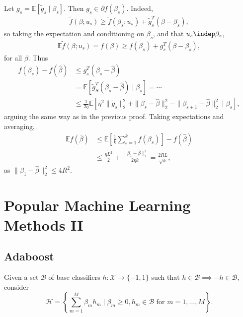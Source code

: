 \documentclass[12pt]{article}
\begin{document}
\begin{proofbox}
	Let $g_s = \mathbb{E}[\tilde g_s \mid \beta_s]$. Then $g_s \in \partial f(\beta_s)$. Indeed,
	\begin{align*}
		\tilde f(\beta; u_s) \geq \tilde f(\beta_s; u_s) + \tilde g_s^T (\beta - \beta_s),
	\end{align*}
	so taking the expectation and conditioning on $\beta_s$, and that $u_s \indep \beta_s$,
	\begin{align*}
		\mathbb{E} \tilde f(\beta; u_s) = f(\beta) \geq f(\beta_s) + g_s^T (\beta - \beta_s),
	\end{align*}
	for all $\beta$. Thus
	\begin{align*}
		f(\beta_s) - f(\hat \beta) &\leq g_s^T(\beta_s - \hat \beta) \\
					   &= \mathbb{E}[ \tilde g_S^T(\beta_s - \hat \beta) \mid \beta_s] = \cdots \\
					   &\leq \frac{1}{2 \eta} \mathbb{E}[\eta^2 \|\tilde g_s\|_2^2 + \|\beta_s - \hat \beta\|_2^2 - \|\beta_{s+1} - \hat \beta\|_2^2 \mid \beta_s],
	\end{align*}
	arguing the same way as in the previous proof. Taking expectations and averaging,
	\begin{align*}
		\mathbb{E} f(\bar \beta) &\leq \mathbb{E}\left[ \frac{1}{k}\sum_{s = 1}^k f(\beta_s)\right] - f(\hat \beta) \\
					 &\leq \frac{\eta L^2}{2} + \frac{\|\beta_1 - \hat \beta\|_2^2}{2 \eta k} = \frac{2RL}{\sqrt k},
	\end{align*}
	as $\|\beta_1 - \hat \beta\|_2^2 \leq 4R^2$.
\end{proofbox}

\newpage

\section{Popular Machine Learning Methods II}
\label{sec:pop}

\subsection{Adaboost}
\label{sub:adb}

Given a set $\mathcal{B}$ of base classifiers $h : \mathcal{X} \to \{-1, 1\}$ such that $h \in \mathcal{B} \implies -h \in \mathcal{B}$, consider
\[
	\mathcal{H} = \left\{ \sum_{m = 1}^M \beta_m h_m \mid \beta_m \geq 0, h_m \in \mathcal{B} \text{ for } m = 1, \ldots, M\right\}.
\]
\end{document}
